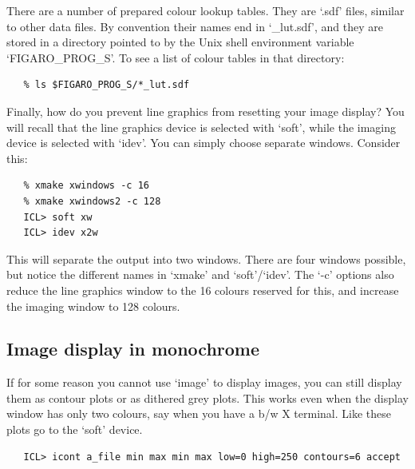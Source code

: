    There are a number of prepared colour lookup tables. They are
   `.sdf' files, similar to other data files. By convention their
   names end in `\_lut.sdf', and they are stored in a directory pointed
   to by the Unix shell environment variable `FIGARO\_PROG\_S'. To see a
   list of colour tables in that directory:

\begin{verbatim}
   % ls $FIGARO_PROG_S/*_lut.sdf
\end{verbatim}

   Finally, how do you prevent line graphics from resetting your image
   display? You will recall that the line graphics device is selected
   with `soft', while the imaging device is selected with `idev'.
   You can simply choose separate windows. Consider this:

\begin{verbatim}
   % xmake xwindows -c 16
   % xmake xwindows2 -c 128
   ICL> soft xw
   ICL> idev x2w
\end{verbatim}

   This will separate the output into two windows. There are four
   windows possible, but notice the different names in `xmake' and
   `soft'/`idev'. The `-c' options also reduce the line graphics
   window to the 16 colours reserved for this, and increase the imaging
   window to 128 colours.


\subsection{\label{lookicont}Image display in monochrome}

   If for some reason you cannot use `image' to display images, you
   can still display them as contour plots or as dithered grey plots.
   This works even when the display window has only two colours, say
   when you have a b/w X terminal. Like
   {}
   these plots go to the `soft' device.

\begin{verbatim}
   ICL> icont a_file min max min max low=0 high=250 contours=6 accept
\end{verbatim}

